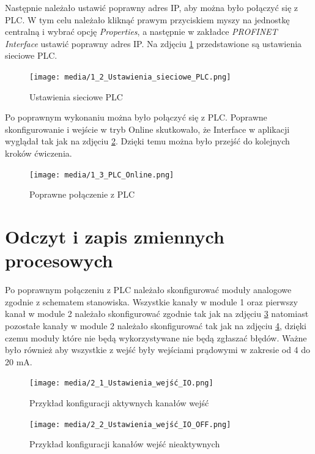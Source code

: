 \documentclass{article}
\begin{document}
Następnie należało ustawić poprawny adres IP, aby można było połączyć się z PLC. W tym celu należało kliknąć prawym przyciskiem myszy na jednostkę centralną i wybrać opcję \textit{Properties}, a następnie w zakładce \textit{PROFINET Interface} ustawić poprawny adres IP. Na zdjęciu \ref{fig:zdj2} przedstawione są ustawienia sieciowe PLC.
\begin{figure}[H]
    \centering
    \texttt{[image: media/1\_2\_Ustawienia\_sieciowe\_PLC.png]}
    \caption{Ustawienia sieciowe PLC}
    \label{fig:zdj2}
\end{figure}

Po poprawnym wykonaniu można było połączyć się z PLC. Poprawne skonfigurowanie i wejście w tryb Online skutkowało, że Interface w aplikacji wyglądał tak jak na zdjęciu \ref{fig:zdj3}. Dzięki temu można było przejść do kolejnych kroków ćwiczenia.
\begin{figure}[H]
    \centering
    \texttt{[image: media/1\_3\_PLC\_Online.png]}
    \caption{Poprawne połączenie z PLC}
    \label{fig:zdj3}
\end{figure}


\newpage
\section{Odczyt i zapis zmiennych procesowych}
Po poprawnym połączeniu z PLC należało skonfigurować moduły analogowe zgodnie z schematem stanowiska. Wszystkie kanały w module 1 oraz pierwszy kanał w module 2 należało skonfigurować zgodnie tak jak na zdjęciu \ref{fig:zdj4} natomiast pozostałe kanały w module 2 należało skonfigurować tak jak na zdjęciu \ref{fig:zdj5}, dzięki czemu moduły które nie będą wykorzystywane nie będą zgłaszać błędów. Ważne było również aby wszystkie z wejść były wejściami prądowymi w zakresie od 4 do 20 mA.
\begin{figure}[H]
    \centering
    \texttt{[image: media/2\_1\_Ustawienia\_wejść\_IO.png]}
    \caption{Przykład konfiguracji aktywnych kanałów wejść}
    \label{fig:zdj4}
\end{figure}

\begin{figure}[H]
    \centering
    \texttt{[image: media/2\_2\_Ustawienia\_wejść\_IO\_OFF.png]}
    \caption{Przykład konfiguracji kanałów wejść nieaktywnych}
    \label{fig:zdj5}
\end{figure}
\end{document}
